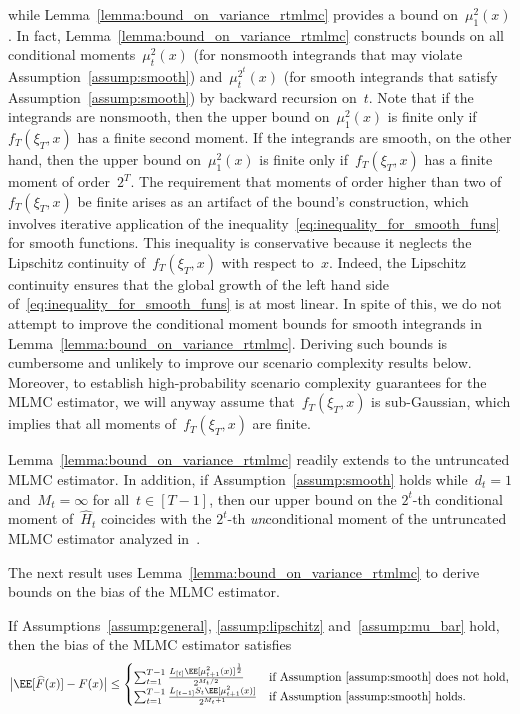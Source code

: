 \documentclass[11pt]{article}
\let\hat\widehat
\begin{document}
while Lemma~\ref{lemma:bound_on_variance_rtmlmc} provides a bound on~$\mu_1^2(x)$.
In fact, Lemma~\ref{lemma:bound_on_variance_rtmlmc} constructs bounds on all conditional moments~$\mu_t^2(x)$ (for nonsmooth integrands that may violate Assumption~\ref{assump:smooth}) and~$\mu_t^{2^t}(x)$ (for smooth integrands that satisfy Assumption~\ref{assump:smooth}) by backward recursion on~$t$. Note that if the integrands are nonsmooth, then the upper bound on~$\mu_1^2(x)$ is finite only if~$f_T(\xi_T,x)$ has a finite second moment. If the integrands are smooth, on the other hand, then the upper bound on~$\mu_1^2(x)$ is finite only if~$f_T(\xi_T,x)$ has a finite moment of order~$2^T$. The requirement that moments of order higher than two of~$f_T(\xi_T, x)$ be finite arises as an artifact of the bound's construction, which involves iterative application of the inequality~\eqref{eq:inequality_for_smooth_funs} for smooth functions. This inequality is conservative because it neglects the Lipschitz continuity of~$f_T(\xi_T, x)$ with respect to~$x$. Indeed, the Lipschitz continuity ensures that the global growth of the left hand side of~\eqref{eq:inequality_for_smooth_funs} is at most linear. In spite of this, we do not attempt to improve the conditional moment bounds for smooth integrands in Lemma~\ref{lemma:bound_on_variance_rtmlmc}. Deriving such bounds is cumbersome and unlikely to improve our scenario complexity results below. Moreover, to establish high-probability scenario complexity guarantees for the MLMC estimator, we will anyway assume that~$f_T(\xi_T, x)$ is sub-Gaussian, which implies that all moments of~$f_T(\xi_T, x)$ are finite. 

Lemma~\ref{lemma:bound_on_variance_rtmlmc} readily extends to the untruncated MLMC estimator. In addition, if Assumption~\ref{assump:smooth} holds while~$d_t=1$ and~$M_t = \infty$ for all~$t\in[T-1]$, then our upper bound on the $2^t$-th conditional moment of~$\hat{H}_{t}$ coincides with the $2^t$-th \emph{un}conditional moment of the untruncated MLMC estimator analyzed in~\cite{syed2023optimal}.

The next result uses Lemma~\ref{lemma:bound_on_variance_rtmlmc} to derive bounds on the bias of the MLMC estimator.

\begin{lemma}
\label{lemma:bias_bound_rtmlmc}
If Assumptions~\ref{assump:general}, \ref{assump:lipschitz} and~\ref{assump:mu_bar} hold, then the bias of the MLMC estimator satisfies
    \begin{align*}
      \big|\EE[\hat{F}(x)] - F(x)\big| \leq \begin{cases} \sum_{t=1}^{T-1}\frac{L_{[t]}\EE[\mu_{t+1}^2(x)]^\frac{1}{2}}{2^{M_t/2}}&\text{if Assumption~\ref{assump:smooth} does not hold,}\\
       \sum_{t=1}^{T-1}\frac{L_{[t-1]}S_t \EE[\mu_{t+1}^{2}(x)]}{2^{M_t + 1}} &\text{if Assumption~\ref{assump:smooth} holds.}\end{cases}
    \end{align*}
\end{lemma}
\end{document}
